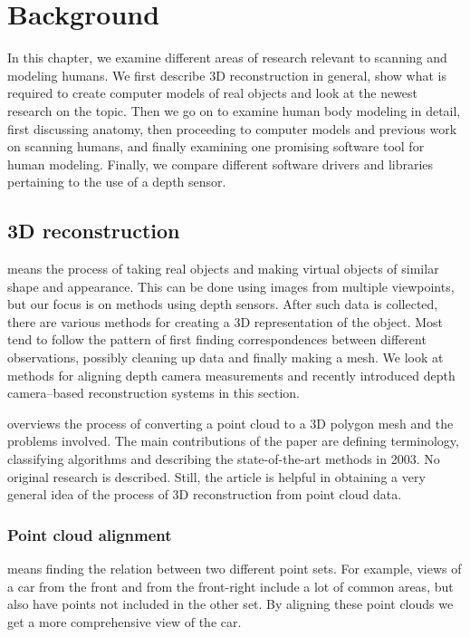 \chapter{Background} \label{literature}

In this chapter, we examine different areas of research relevant to scanning and modeling humans. We first describe 3D reconstruction in general, show what is required to create computer models of real objects and look at the newest research on the topic. Then we go on to examine human body modeling in detail, first discussing anatomy, then proceeding to computer models and previous work on scanning humans, and finally examining one promising software tool for human modeling. Finally, we compare different software drivers and libraries pertaining to the use of a depth sensor.

\section{3D reconstruction}

 means the process of taking real objects and making virtual objects of similar shape and appearance. This can be done using images from multiple viewpoints, but our focus is on methods using depth sensors. After such data is collected, there are various methods for creating a 3D representation of the object. Most tend to follow the pattern of first finding correspondences between different observations, possibly cleaning up data and finally making a mesh. We look at methods for aligning depth camera measurements and recently introduced depth camera--based reconstruction systems in this section.

\citet{fabio2003point} overviews the process of converting a point cloud to a 3D polygon mesh and the problems involved. The main contributions of the paper are defining terminology, classifying algorithms and describing the state-of-the-art methods in 2003. No original research is described. Still, the article is helpful in obtaining a very general idea of the process of 3D reconstruction from point cloud data.


\subsection{Point cloud alignment} \label{literature.alignment}

 means finding the relation between two different point sets. For example, views of a car from the front and from the front-right include a lot of common areas, but also have points not included in the other set. By aligning these point clouds we get a more comprehensive view of the car.


